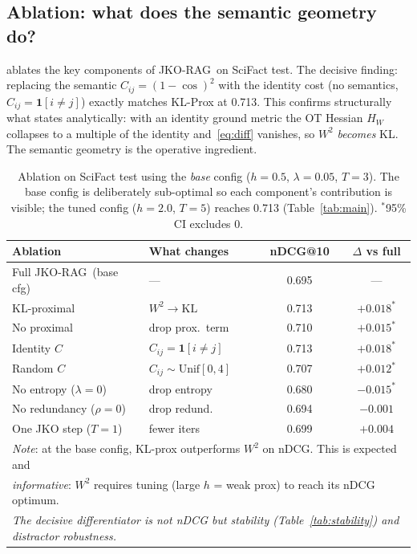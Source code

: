 \documentclass{article}
\theoremstyle{plain}
\newcommand{\jko}{\textsc{JKO-RAG}}
\begin{document}
\subsection{Ablation: what does the semantic geometry do?}

 ablates the key components of \jko\ on SciFact test. The decisive finding: replacing the semantic $C_{ij}=(1-\cos)^2$ with the identity cost (no semantics, $C_{ij}=\mathbf{1}[i\neq j]$) exactly matches KL-Prox at 0.713. This confirms structurally what  states analytically: with an identity ground metric the OT Hessian $H_W$ collapses to a multiple of the identity and~\eqref{eq:diff} vanishes, so $W^2$ \emph{becomes} KL. The semantic geometry is the operative ingredient.

\begin{table}[h]
\centering\small
\caption{Ablation on SciFact test using the \emph{base} config ($h{=}0.5$, $\lambda{=}0.05$, $T{=}3$). The base config is deliberately sub-optimal so each component's contribution is visible; the tuned config ($h{=}2.0$, $T{=}5$) reaches 0.713 (Table~\ref{tab:main}). $^*$95\% CI excludes 0.}
\label{tab:ablation}
\setlength\tabcolsep{5pt}
\begin{tabular}{@{}llcc@{}}
\toprule
Ablation & What changes & nDCG@10 & $\Delta$ vs full \\
\midrule
Full \jko\ (base cfg) & --- & 0.695 & --- \\
KL-proximal   & $W^2\to\mathrm{KL}$ & 0.713 & $+0.018^*$ \\
No proximal   & drop prox.\ term & 0.710 & $+0.015^*$ \\
Identity $C$  & $C_{ij}=\mathbf{1}[i\!\neq\!j]$ & 0.713 & $+0.018^*$ \\
Random $C$    & $C_{ij}\sim\mathrm{Unif}[0,4]$ & 0.707 & $+0.012^*$ \\
No entropy ($\lambda{=}0$) & drop entropy & 0.680 & $-0.015^*$ \\
No redundancy ($\rho{=}0$) & drop redund. & 0.694 & $-0.001$ \\
One JKO step ($T{=}1$)    & fewer iters & 0.699 & $+0.004$ \\
\bottomrule
\multicolumn{4}{l}{\small \textit{Note}: at the base config, KL-prox outperforms $W^2$ on nDCG. This is expected and}\\
\multicolumn{4}{l}{\small \textit{informative}: $W^2$ requires tuning (large $h$ = weak prox) to reach its nDCG optimum.}\\
\multicolumn{4}{l}{\small \textit{The decisive differentiator is not nDCG but stability (Table~\ref{tab:stability}) and distractor robustness.}}
\end{tabular}
\end{table}
\end{document}

